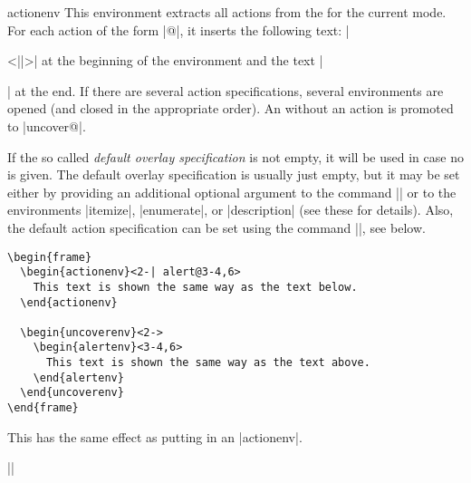 \begin{environment}{{actionenv}}
  This environment extracts all actions from the  for the current mode. For each action of the form |@|, it inserts the following text: |\begin{|\meta{action}|env}<||>| at the beginning of the environment and the text |\end{|\meta{action}|env}| at the end. If there are several action specifications, several environments are opened (and closed in the appropriate order). An  without an action is promoted to |uncover@|.

  If the so called \emph{default overlay specification} is not empty, it will be used in case no  is given. The default overlay specification is usually just empty, but it may be set either by providing an additional optional argument to the command |\frame| or to the environments |itemize|, |enumerate|, or |description| (see these for details). Also, the default action specification can be set using the command |\beamerdefaultoverlayspecification|, see below.

  \example
\begin{verbatim}
\begin{frame}
  \begin{actionenv}<2-| alert@3-4,6>
    This text is shown the same way as the text below.
  \end{actionenv}

  \begin{uncoverenv}<2->
    \begin{alertenv}<3-4,6>
      This text is shown the same way as the text above.
    \end{alertenv}
  \end{uncoverenv}
\end{frame}
\end{verbatim}
\end{environment}

\begin{command}{\action{}}
  This has the same effect as putting  in an |actionenv|.

  \example
  ||
\end{command}

